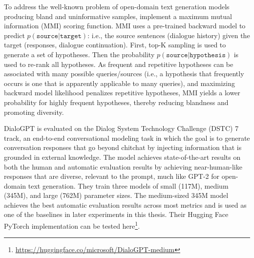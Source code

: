 To address the well-known problem of open-domain text generation models producing bland and uninformative samples, \cite{zhang2019dialogpt} implement a maximum mutual information (MMI) scoring function. MMI uses a pre-trained backward model to predict $p(\texttt{source} | \texttt{target})$: i.e., the source sentences (dialogue history) given the target (responses, dialogue continuation). First, top-K sampling is used to generate a set of hypotheses. Then the probability $p(\texttt{source} | \texttt{hypothesis})$ is used to re-rank all hypotheses. As frequent and repetitive hypotheses can be associated with many possible queries/sources (i.e., a hypothesis that frequently occurs is one that is apparently applicable to many queries), and maximizing backward model likelihood penalizes repetitive hypotheses, MMI yields a lower probability for highly frequent hypotheses, thereby reducing blandness and promoting diversity. 

DialoGPT is evaluated on the Dialog System Technology Challenge (DSTC) 7 track, an end-to-end conversational modeling task in which the goal is to generate conversation responses that go beyond chitchat by injecting information that is grounded in external knowledge. The model achieves state-of-the-art results on both the human and automatic evaluation results by achieving near-human-like responses that are diverse, relevant to the prompt, much like GPT-2 for open-domain text generation. They train three models of small (117M), medium (345M), and large (762M) parameter sizes. The medium-sized 345M model achieves the best automatic evaluation results across most metrics and is used as one of the baselines in later experiments in this thesis. Their Hugging Face PyTorch implementation can be tested here\footnote{\url{https://huggingface.co/microsoft/DialoGPT-medium}}.





